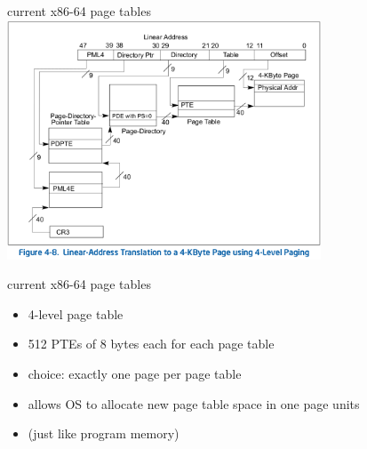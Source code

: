 \begin{frame}{current x86-64 page tables}
\includegraphics[width=0.7\textwidth]{../vm/intel4Level}
\end{frame}

\begin{frame}{current x86-64 page tables}
\begin{itemize}
\item 4-level page table
\item 512 PTEs of 8 bytes each for each page table
\item choice: exactly one page per page table
\item allows OS to allocate new page table space in one page units
\item (just like program memory)
\end{itemize}
\end{frame}

